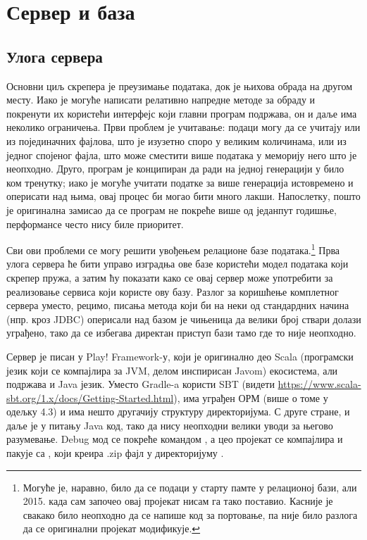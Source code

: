 \chapter{Сервер и база}\label{ch:\thechapter}

\section{Улога сервера}

Основни циљ скрепера је преузимање података, док је њихова обрада на другом месту. Иако је могуће написати релативно напредне методе за обраду и покренути их користећи интерфејс који главни програм подржава, он и даље има неколико ограничења. Први проблем је учитавање: подаци могу да се учитају или из појединачних фајлова, што је изузетно споро у великим количинама, или из једног спојеног фајла, што може сместити више података у меморију него што је неопходно. Друго, програм је конципиран да ради на једној генерацији у било ком тренутку; иако је могуће учитати податке за више генерација истовремено и оперисати над њима, овај процес би могао бити много лакши. Напослетку, пошто је оригинална замисао да се програм не покреће више од једанпут годишње, перформансе често нису биле приоритет.

Сви ови проблеми се могу решити увођењем релационе базе података.\footnote{Могуће је, наравно, било да се подаци у старту памте у релационој бази, али 2015. када сам започео овај пројекат нисам га тако поставио. Касније је свакако било неопходно да се напише код за портовање, па није било разлога да се оригинални пројекат модификује.} Прва улога сервера ће бити управо изградња ове базе користећи модел података који скрепер пружа, а затим ћу показати како се овај сервер може употребити за реализовање сервиса који користе ову базу. Разлог за коришћење комплетног сервера уместо, рецимо, писања метода који би на неки од стандардних начина (нпр. кроз JDBC) оперисали над базом је чињеница да велики број ствари долази уграђено, тако да се избегава директан приступ бази тамо где то није неопходно.

Сервер је писан у Play! Framework-у, који је оригинално део Scala (програмски језик који се компајлира за JVM, делом инспирисан Javom) екосистема, али подржава и Java језик. Уместо Gradle-a користи SBT (видети \url{https://www.scala-sbt.org/1.x/docs/Getting-Started.html}), има уграђен ОРМ (више о томе у одељку 4.3) и има нешто другачију структуру директоријума. С друге стране, и даље је у питању Java код, тако да нису неопходни велики уводи за његово разумевање. Debug мод се покреће командом , а цео пројекат се компајлира и пакује са , који креира .zip фајл у директоријуму .



